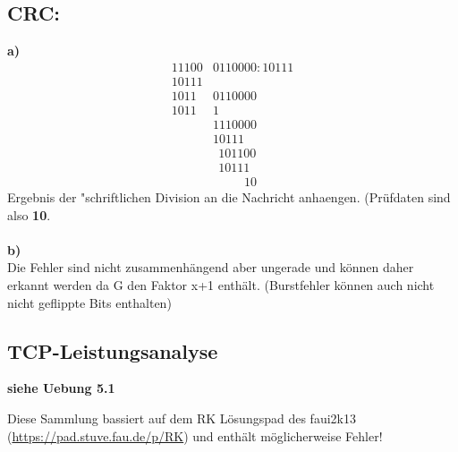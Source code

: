\documentclass{article}
\begin{document}
		\subsection{CRC:}
			\textbf{a)}		
		\begin{align*}
		    11100&0110000 : 10111 \\
    		10111&			\\
      		 1011&0110000	\\
      		 1011&1			\\
                 &1110000 	\\
                 &10111		\\
                 &\;\,101100	\\
                 &\;\,10111	\\
                 &\;\;\;\;\;\;\;\;\;10
		\end{align*}
		Ergebnis der "schriftlichen Division an die Nachricht anhaengen. (Pr\"ufdaten sind also \textbf{10}.\\\\
			\textbf{b)}\\
				Die Fehler sind nicht zusammenh\"angend aber ungerade und k\"onnen daher erkannt werden da
				G den Faktor x+1 enthält. (Burstfehler k\"onnen auch nicht nicht geflippte Bits enthalten)
		\subsection{TCP-Leistungsanalyse}
			\textbf{siehe Uebung 5.1}
	
	\begin{small}
		Diese Sammlung bassiert auf dem RK L\"osungspad des faui2k13 (\url{https://pad.stuve.fau.de/p/RK}) und enthält möglicherweise Fehler!
	\end{small}			
\end{document}
